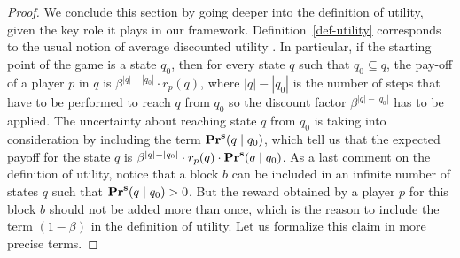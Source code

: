 \begin{proof}
We conclude this section by going deeper into the definition of utility, given the key role it plays in our framework.
Definition~\ref{def-utility} corresponds to the usual notion of average discounted utility . In particular, if the starting point of the game is a state $q_0$, then for every state $q$ such that $q_0 \subseteq q$, the pay-off of a player $p$ in $q$ is $\beta^{|q|-|q_0|} \cdot r_p(q)$, where $|q|-|q_0|$ is the number of steps that have to be performed to reach $q$ from $q_0$ so the discount factor $\beta^{|q|-|q_0|}$ has to be applied. The uncertainty  about reaching state $q$ from $q_0$ is taking into consideration by including the term $\mathbf{Pr}^{\mathbf{s}}(q \mid q_0)$, which tell us that the expected payoff for the state $q$ is $\beta^{|q|-|q_0|} \cdot  r_p(q) \cdot \mathbf{Pr}^{\mathbf{s}}(q \mid q_0)$.
%
As a last comment on the definition of utility, notice that a block $b$ can be included in an infinite number of states $q$ such that $\mathbf{Pr}^{\mathbf{s}}(q \mid q_0) > 0$. But the reward obtained by a player $p$ for this block $b$ should not be added more than once, which is the reason to include the term $(1 - \beta)$ in the definition of utility. Let us formalize this claim in more precise terms.


\end{proof}
